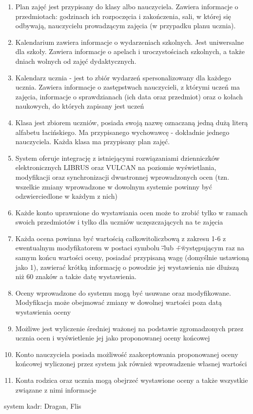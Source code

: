 \documentclass{article}
\begin{document}
\begin{enumerate}
    \item Plan zajęć jest przypisany do klasy albo nauczyciela. Zawiera informacje o przedmiotach: godzinach ich rozpoczęcia i zakończenia, sali, w której się odbywają, nauczycielu prowadzącym zajęcia (w przypadku planu ucznia).
    \item Kalendarium zawiera informacje o wydarzeniach szkolnych. Jest uniwersalne dla szkoły. Zawiera informacje o apelach i uroczystościach szkolnych, a także dniach wolnych od zajęć dydaktycznych.
    \item Kalendarz ucznia - jest to zbiór wydarzeń spersonalizowany dla każdego ucznia. Zawiera informacje o zastępstwach nauczycieli, z którymi uczeń ma zajęcia, informacje o sprawdzianach (ich data oraz przedmiot) oraz o kołach naukowych, do których zapisany jest uczeń
    \item Klasa jest zbiorem uczniów, posiada swoją nazwę oznaczaną jedną dużą literą alfabetu łacińskiego. Ma przypisanego wychowawcę - dokładnie jednego nauczyciela. Każda klasa ma przypisany plan zajęć.

    \item System oferuje integrację z istniejącymi rozwiązaniami dzienniczków elektronicznych LIBRUS oraz VULCAN na poziomie wyświetlania, modyfikacji oraz synchronizacji dwustronnej wprowadzonych ocen (tzn. wszelkie zmiany wprowadzone w dowolnym systemie powinny być odzwierciedlone w każdym z nich)
    \item Każde konto uprawnione do wystawiania ocen może to zrobić tylko w ramach swoich przedmiotów i tylko dla uczniów uczęszczających na te zajęcia
    \item Każda ocena powinna być wartością całkowitoliczbową z zakresu 1-6 z ewentualnym modyfikatorem w postaci symbolu \"-\" lub \"+\" występującym raz na samym końcu wartości oceny, posiadać przypisaną wagę (domyślnie ustawioną jako 1), zawierać krótką informację o powodzie jej wystawienia nie dłuższą niż 60 znaków a także datę wystawienia.
    \item Oceny wprowadzone do systemu mogą być usuwane oraz modyfikowane. Modyfikacja może obejmować zmiany w dowolnej wartości poza datą wystawienia oceny
    \item Możliwe jest wyliczenie średniej ważonej na podstawie zgromadzonych przez ucznia ocen i wyświetlenie jej jako proponowanej oceny końcowej
    \item Konto nauczyciela posiada możliwość zaakceptowania proponowanej oceny końcowej wyliczonej przez system jak również wprowadzenie własnej wartości
    \item Konta rodzica oraz ucznia mogą obejrzeć wystawione oceny a także wszystkie związane z nimi informacje
\end{enumerate}
system kadr: Dragan, Flis
\end{document}
